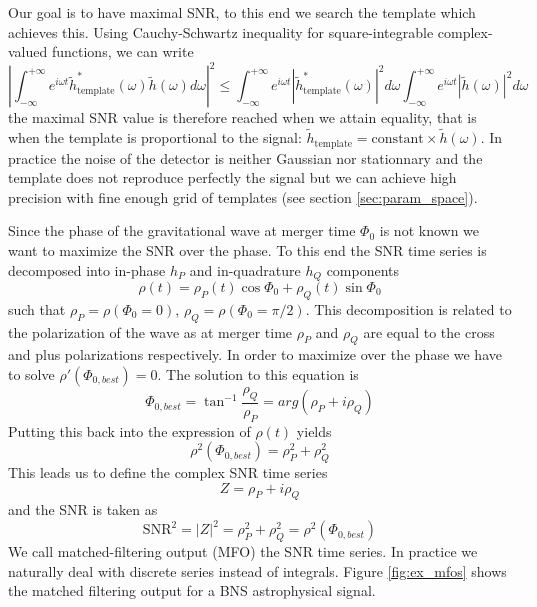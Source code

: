 %
Our goal is to have maximal SNR, to this end we search the template which achieves this.
Using Cauchy-Schwartz inequality for square-integrable complex-valued functions, we can write
%
\begin{equation}
  \left| \int_{-\infty}^{+\infty} e^{i\omega t} \tilde h_{\textrm{template}}^*(\omega) \tilde{h}(\omega) d\omega \right|^2 \leq \int_{-\infty}^{+\infty} e^{i\omega t} \left| \tilde h_{\textrm{template}}^*(\omega) \right|^2 d\omega  \int_{-\infty}^{+\infty} e^{i\omega t} \left|\tilde{h}(\omega) \right|^2 d\omega
\end{equation}
%
the maximal SNR value is therefore reached when we attain equality, that is when the template is proportional to the signal: $\tilde h_{\textrm{template}} = \textrm{constant} \times \tilde{h}(\omega)$.
In practice the noise of the detector is neither Gaussian nor stationnary and the template does not reproduce perfectly the signal but we can achieve high precision with fine enough grid of templates (see section \ref{sec:param_space}).

Since the phase of the gravitational wave at merger time $\Phi_0$ is not known we want to maximize the SNR over the phase.
To this end the SNR time series is decomposed into in-phase $h_P$ and in-quadrature $h_Q$ components
%
\begin{equation}
  \rho(t) = \rho_P(t)\cos\Phi_0 + \rho_Q(t)\sin\Phi_0
\end{equation}
%
such that $\rho_P = \rho(\Phi_0=0)$, $\rho_Q = \rho(\Phi_0=\pi/2)$.
This decomposition is related to the polarization of the wave as at merger time $\rho_P$ and $\rho_Q$ are equal to the cross and plus polarizations respectively.
In order to maximize over the phase we have to solve $\rho'(\Phi_{0,best})=0$.
The solution to this equation is
%
\begin{equation}
  \Phi_{0,best} = \tan^{-1} \frac{\rho_Q}{\rho_P} = arg(\rho_P+i\rho_Q)
\end{equation}
%
Putting this back into the expression of $\rho(t)$ yields
%
\begin{equation}
  \rho^2(\Phi_{0,best}) = \rho^2_P + \rho^2_Q
\end{equation}
%
This leads us to define the complex SNR time series
%
\begin{equation}
  Z = \rho_P +i\rho_Q
\end{equation}
%
and the SNR is taken as
%
\begin{equation}
  \text{SNR}^2 = \left| Z \right|^2 = \rho^2_P + \rho^2_Q = \rho^2(\Phi_{0,best})
\end{equation}
%
We call matched-filtering output (MFO) the SNR time series.
In practice we naturally deal with discrete series instead of integrals.
Figure \ref{fig:ex_mfos} shows the matched filtering output for a BNS astrophysical signal.

